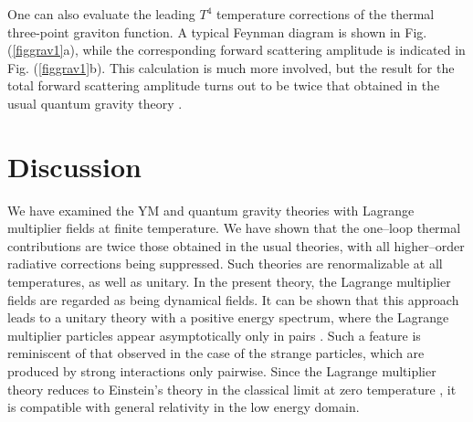 \documentclass[longbibliography,groupedaddress,showpacs,showkeys,amssymb,eqsecnum,aps,nofootinbib,superscriptaddress]{revtex4}
\begin{document}
One can also evaluate the leading $T^4$    
temperature corrections of the thermal three-point graviton function.  
A typical Feynman diagram is shown in 
Fig. (\ref{figgrav1}a), while the corresponding forward scattering
amplitude is indicated in Fig.  (\ref{figgrav1}b). 
This calculation is much more involved,  but the result for the total 
forward scattering amplitude 
turns out to be twice that obtained in the usual quantum gravity 
theory \cite{Brandt:1993dk}. 


\section{Discussion}
We have examined the YM and quantum gravity theories with Lagrange
multiplier fields at finite temperature. We have shown that the
one--loop thermal contributions are twice those obtained in the usual
theories, with all higher--order radiative corrections being
suppressed. Such theories are renormalizable at all temperatures, 
as well as unitary. %
In  the present theory, the Lagrange multiplier fields are regarded as being 
dynamical fields. It can be shown that this approach leads to a unitary theory 
with a positive energy spectrum, where the Lagrange multiplier particles appear
asymptotically only in pairs \cite{Brandt:2021ycu}. Such a feature is reminiscent of that observed in the case of the strange particles, which are produced by strong interactions only pairwise. Since the Lagrange multiplier theory reduces to Einstein's theory in the classical limit at zero temperature
\cite{McKeon:1992rq,PhysRevD.100.125014,Brandt:2018lbe,McKeon:2020pkm,Brandt:2021ycu}, it is compatible with general relativity in the low energy domain.
\end{document}
